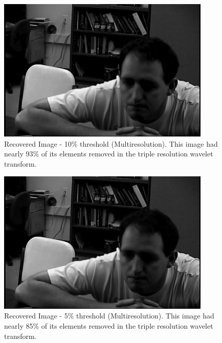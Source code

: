 \begin{figure}[htb]
\begin{center}
\includegraphics [width=4in]{recover3R010T.jpg}
\end{center}
\caption{Recovered Image - 10\% threshold (Multiresolution). This image had nearly 93\% of its elements removed in the triple resolution wavelet transform.  }
\label{recover3R010}
\end{figure}


\begin{figure}[htb]
\begin{center}
\includegraphics [width=4in]{recover3R005T.jpg}
\end{center}
\caption{Recovered Image - 5\% threshold (Multiresolution). This image had nearly 85\% of its elements removed in the triple resolution wavelet transform.    }
\label{recover3R005}
\end{figure}


